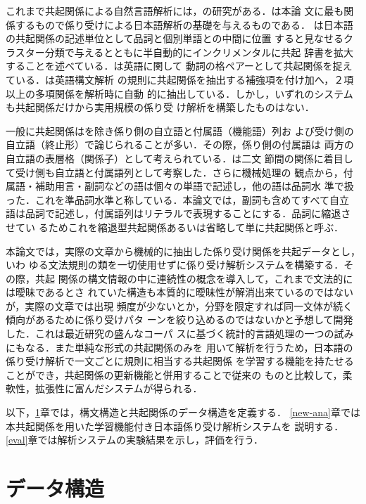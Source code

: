 これまで共起関係による自然言語解析には，\cite[など]{Yoshida1972,Shirai1986,TsutsumiAndTsutsumi1988,Matsumoto1992}の研究がある．\cite{Yoshida1972}は本論
文に最も関係するもので係り受けによる日本語解析の基礎を与えるものである．
\cite{Shirai1986}は日本語の共起関係の記述単位として品詞と個別単語との中間に位置
すると見なせるクラスター分類で与えるとともに半自動的にインクリメンタルに共起
辞書を拡大することを述べている．\cite{TsutsumiAndTsutsumi1988}は英語に関して
動詞の格ペアーとして共起関係を捉えている．\cite{Matsumoto1992}は英語構文解析
の規則に共起関係を抽出する補強項を付け加へ，２項以上の多項関係を解析時に自動
的に抽出している．しかし，いずれのシステムも共起関係だけから実用規模の係り受
け解析を構築したものはない．

一般に共起関係は\cite{Yoshida1972}を除き係り側の自立語と付属語（機能語）列お
よび受け側の自立語（終止形）で論じられることが多い．その際，係り側の付属語は
両方の自立語の表層格（関係子）として考えられている．\cite{Yoshida1972}は二文
節間の関係に着目して受け側も自立語と付属語列として考察した．さらに機械処理の
観点から，付属語・補助用言・副詞などの語は個々の単語で記述し，他の語は品詞水
準で扱った．これを準品詞水準と称している．本論文では，副詞も含めてすべて自立
語は品詞で記述し，付属語列はリテラルで表現することにする．品詞に縮退させてい
るためこれを縮退型共起関係あるいは省略して単に共起関係と呼ぶ．

本論文では，実際の文章から機械的に抽出した係り受け関係を共起データとし，いわ
ゆる文法規則の類を一切使用せずに係り受け解析システムを構築する．その際，共起
関係の構文情報の中に連続性の概念を導入して，これまで文法的には曖昧であるとさ
れていた構造も本質的に曖昧性が解消出来ているのではないが，実際の文章では出現
頻度が少ないとか，分野を限定すれば同一文体が続く傾向があるために係り受けパタ
ーンを絞り込めるのではないかと予想して開発した．これは最近研究の盛んなコーパ
スに基づく統計的言語処理の一つの試みにもなる．また単純な形式の共起関係のみを
用いて解析を行うため，日本語の係り受け解析で一文ごとに規則に相当する共起関係
を学習する機能を持たせることができ，共起関係の更新機能と併用することで従来の
ものと比較して，柔軟性，拡張性に富んだシステムが得られる．

以下，\ref{data-str}章では，構文構造と共起関係のデータ構造を定義する．
\ref{new-ana}章では本共起関係を用いた学習機能付き日本語係り受け解析システムを
説明する．\ref{eval}章では解析システムの実験結果を示し，評価を行う．

\section{データ構造}
\label{data-str}

